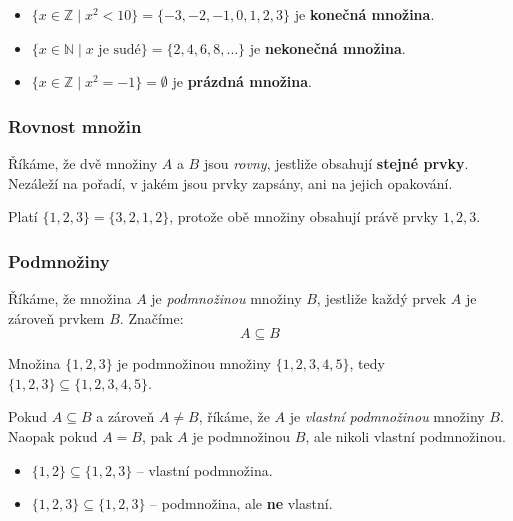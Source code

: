 \documentclass[12pt,a4paper]{article}
\begin{document}
\begin{examplebox}
\begin{itemize}
    \item $\{x \in \mathbb{Z} \mid x^2 < 10\} = \{-3,-2,-1,0,1,2,3\}$ je \textbf{konečná množina}.  
    \item $\{x \in \mathbb{N} \mid x \text{ je sudé}\} = \{2,4,6,8,\dots\}$ je \textbf{nekonečná množina}.  
    \item $\{x \in \mathbb{Z} \mid x^2 = -1\} = \emptyset$ je \textbf{prázdná množina}.
\end{itemize}
\end{examplebox}

\subsubsection*{Rovnost množin}
Říkáme, že dvě množiny $A$ a $B$ jsou \emph{rovny}, jestliže obsahují \textbf{stejné prvky}.  
Nezáleží na pořadí, v jakém jsou prvky zapsány, ani na jejich opakování.  

\begin{examplebox}
Platí $\{1,2,3\} = \{3,2,1,2\}$, protože obě množiny obsahují právě prvky $1,2,3$.  
\end{examplebox}


\subsubsection*{Podmnožiny}
Říkáme, že množina $A$ je \emph{podmnožinou} množiny $B$, jestliže každý prvek $A$ je zároveň prvkem $B$.  
Značíme:
\[
A \subseteq B
\]

\begin{examplebox}
Množina $\{1,2,3\}$ je podmnožinou množiny $\{1,2,3,4,5\}$, tedy $\{1,2,3\} \subseteq \{1,2,3,4,5\}$.
\end{examplebox}

Pokud $A \subseteq B$ a zároveň $A \neq B$, říkáme, že $A$ je \emph{vlastní podmnožinou} množiny $B$.  
Naopak pokud $A = B$, pak $A$ je podmnožinou $B$, ale nikoli vlastní podmnožinou.

\begin{examplebox}
\begin{itemize}
    \item $\{1,2\} \subseteq \{1,2,3\}$ – vlastní podmnožina.  
    \item $\{1,2,3\} \subseteq \{1,2,3\}$ – podmnožina, ale \textbf{ne} vlastní.
\end{itemize}
\end{examplebox}
\end{document}
